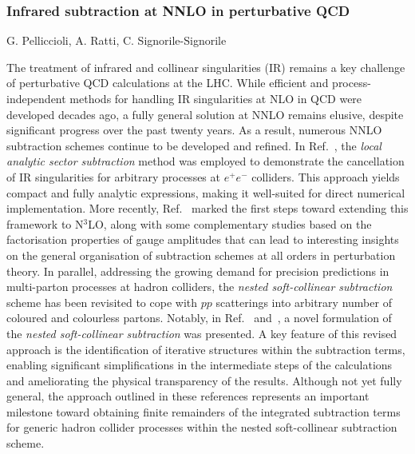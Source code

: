 \documentclass{FBR_Bericht_2025}
\begin{document}
\begin{refsection}
\subsubsection{Infrared subtraction at NNLO in perturbative QCD}
\begin{Namen}
G. Pelliccioli, A. Ratti, C. Signorile-Signorile
\end{Namen}
The treatment of infrared and collinear singularities (IR) remains a key challenge of perturbative QCD calculations at the LHC.
%
While efficient and process-independent methods for handling IR singularities at NLO in QCD were developed decades ago, a fully general solution at NNLO remains elusive, despite significant progress over the past twenty years.
As a result, numerous NNLO subtraction schemes continue to be developed and refined. In Ref.~\cite{Bertolotti:2022aih}, the \emph{local analytic sector subtraction} method was employed to demonstrate the cancellation of IR singularities for arbitrary processes at $e^+e^-$ colliders. This approach yields compact and fully analytic expressions, making it well-suited for direct numerical implementation. 
More recently, Ref.~\cite{Magnea:2024jqg} marked the first steps toward extending this framework to N${}^3$LO, along with some complementary studies based on the factorisation properties of gauge amplitudes that can lead to interesting insights on the general organisation of subtraction schemes at all orders in perturbation theory.
In parallel, addressing the growing demand for precision predictions in multi-parton processes at hadron colliders, the \emph{nested soft-collinear subtraction} scheme has been revisited to cope with $pp$ scatterings into arbitrary number of coloured and colourless partons. Notably, in Ref.~\cite{Devoto:2023rpv} and~\cite{Devoto:2025kin}, 
a novel formulation of the \emph{nested soft-collinear subtraction} was presented. 
A key feature of this revised approach is the identification of iterative structures within the subtraction terms,
enabling significant simplifications in the intermediate steps of the calculations and ameliorating the physical transparency of the results. 
Although not yet fully general, the approach outlined in these references represents an important milestone toward obtaining finite remainders of the integrated subtraction terms for generic hadron collider processes within the nested soft-collinear subtraction scheme.
%

\end{refsection}
\end{document}
